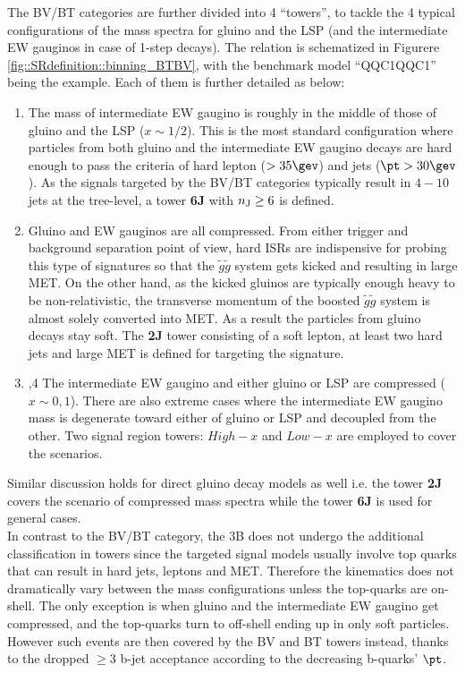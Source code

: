 \clearpage
The BV/BT categories are further divided into 4 ``towers'', to tackle the 4 typical configurations of the mass spectra for gluino and the LSP (and the intermediate EW gauginos in case of 1-step decays). The relation is schematized in Figurere \ref{fig::SRdefinition::binning_BTBV}, with the benchmark model ``QQC1QQC1'' being the example.
Each of them is further detailed as below:

\begin{enumerate}
\item The mass of intermediate EW gaugino is roughly in the middle of those of gluino and the LSP ($x \sim 1/2$).
This is the most standard configuration where particles from both gluino and the intermediate EW gaugino decays are hard enough to pass the criteria of hard lepton ($>35\gev$) and jets ($\pt>30\gev$). As the signals targeted by the BV/BT categories typically result in $4-10$ jets at the tree-level, a tower \textbf{6J} with $n_{\mathrm{J}} \geq 6$ is defined. 

\item Gluino and EW gauginos are all compressed. 
From either trigger and background separation point of view, hard ISRs are indispensive for probing this type of signatures so that the $\tilde{g}\tilde{g}$ system gets kicked and resulting in large MET. On the other hand, as the kicked gluinos are typically enough heavy to be non-relativistic, the transverse momentum of the boosted $\tilde{g}\tilde{g}$ system is almost solely converted into MET. As a result the particles from gluino decays stay soft. The \textbf{2J} tower consisting of a soft lepton, at least two hard jets and large MET is defined for targeting the signature.

\item,4 The intermediate EW gaugino and either gluino or LSP are compressed ($x \sim 0, 1$). 
There are also extreme cases where the intermediate EW gaugino mass is degenerate toward either of gluino or LSP and decoupled from the other. Two signal region towers: \textbf{$High-x$} and \textbf{$Low-x$} are employed to cover the scenarios. 
\end{enumerate}

Similar discussion holds for direct gluino decay models as well i.e. the tower \textbf{2J} covers the scenario of compressed mass spectra while the tower \textbf{6J} is used for general cases. \\

In contrast to the BV/BT category, the 3B does not undergo the additional classification in towers since the targeted signal models usually involve top quarks that can result in hard jets, leptons and MET. 
Therefore the kinematics does not dramatically vary between the mass configurations unless the top-quarks are on-shell.
The only exception is when gluino and the intermediate EW gaugino get compressed, and the top-quarks turn to off-shell ending up in only soft particles.
However such events are then covered by the BV and BT towers instead, thanks to the dropped $\geq 3$ b-jet acceptance according to the decreasing b-quarks' $\pt$. \\ 

